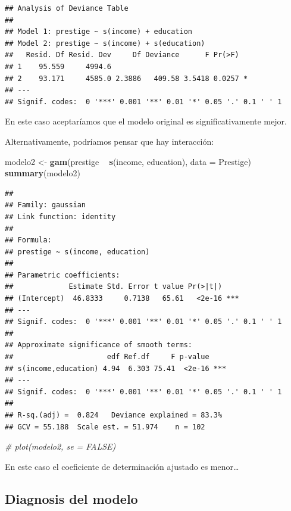 \documentclass[]{book}
\newenvironment{Shaded}{\begin{snugshade}}{\end{snugshade}}
\newcommand{\KeywordTok}[1]{\textcolor[rgb]{0.13,0.29,0.53}{\textbf{#1}}}
\newcommand{\DataTypeTok}[1]{\textcolor[rgb]{0.13,0.29,0.53}{#1}}
\newcommand{\StringTok}[1]{\textcolor[rgb]{0.31,0.60,0.02}{#1}}
\newcommand{\CommentTok}[1]{\textcolor[rgb]{0.56,0.35,0.01}{\textit{#1}}}
\newcommand{\OperatorTok}[1]{\textcolor[rgb]{0.81,0.36,0.00}{\textbf{#1}}}
\newcommand{\NormalTok}[1]{#1}
\begin{document}
\begin{verbatim}
## Analysis of Deviance Table
## 
## Model 1: prestige ~ s(income) + education
## Model 2: prestige ~ s(income) + s(education)
##   Resid. Df Resid. Dev     Df Deviance      F Pr(>F)  
## 1    95.559     4994.6                                
## 2    93.171     4585.0 2.3886   409.58 3.5418 0.0257 *
## ---
## Signif. codes:  0 '***' 0.001 '**' 0.01 '*' 0.05 '.' 0.1 ' ' 1
\end{verbatim}

En este caso aceptaríamos que el modelo original es significativamente
mejor.

Alternativamente, podríamos pensar que hay interacción:

\begin{Shaded}
\begin{Highlighting}[]
\NormalTok{modelo2 <-}\StringTok{ }\KeywordTok{gam}\NormalTok{(prestige }\OperatorTok{~}\StringTok{ }\KeywordTok{s}\NormalTok{(income, education), }\DataTypeTok{data =}\NormalTok{ Prestige)}
\KeywordTok{summary}\NormalTok{(modelo2)}
\end{Highlighting}
\end{Shaded}

\begin{verbatim}
## 
## Family: gaussian 
## Link function: identity 
## 
## Formula:
## prestige ~ s(income, education)
## 
## Parametric coefficients:
##             Estimate Std. Error t value Pr(>|t|)    
## (Intercept)  46.8333     0.7138   65.61   <2e-16 ***
## ---
## Signif. codes:  0 '***' 0.001 '**' 0.01 '*' 0.05 '.' 0.1 ' ' 1
## 
## Approximate significance of smooth terms:
##                      edf Ref.df     F p-value    
## s(income,education) 4.94  6.303 75.41  <2e-16 ***
## ---
## Signif. codes:  0 '***' 0.001 '**' 0.01 '*' 0.05 '.' 0.1 ' ' 1
## 
## R-sq.(adj) =  0.824   Deviance explained = 83.3%
## GCV = 55.188  Scale est. = 51.974    n = 102
\end{verbatim}

\begin{Shaded}
\begin{Highlighting}[]
\CommentTok{# plot(modelo2, se = FALSE)}
\end{Highlighting}
\end{Shaded}

En este caso el coeficiente de determinación ajustado es menor\ldots{}

\subsection{Diagnosis del modelo}\label{diagnosis-del-modelo-2}
\end{document}
